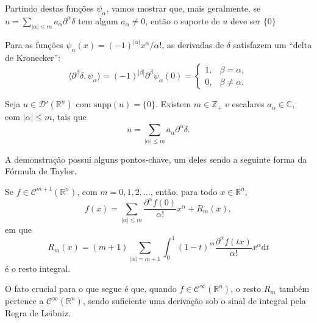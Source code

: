 \documentclass[../distribution_theory_notes.tex]{subfiles}
\begin{document}
Partindo destas funções \(\psi_{\alpha }\), vamos mostrar que, mais geralmente, se \(u = \sum\limits_{| \alpha  |\leq m}^{}a_{\alpha }\partial^{\alpha }\delta \) tem algum \(a_{\alpha }\neq 0\), então o suporte de \(u\) deve ser \(\{0\}\)
\begin{tcolorbox}[
		skin=enhanced,
		title=Observação,
		fonttitle=\bfseries,
		colframe=black,
		colbacktitle=cyan!75!white,
		colback=cyan!15,
		colbacklower=black,
		coltitle=black,
		drop fuzzy shadow,
	]
	Para as funções \(\psi_{\alpha }(x)=(-1)^{|\alpha |}x^{\alpha }/\alpha !\), as derivadas de \(\delta \) satisfazem um ``delta de Kronecker'':
	\[
		\langle \partial^{\beta }\delta , \psi_{\alpha }\rangle
		=(-1)^{|\beta |}\partial^{\beta }\psi_{\alpha }(0)
		=\begin{cases}
			1, & \beta =\alpha ,     \\
			0, & \beta \neq \alpha .
		\end{cases}
	\]
\end{tcolorbox}

\begin{theorem*}
	Seja \(u\in \mathcal{D}'(\mathbb{R}^{n})\) com \(\mathrm{supp}(u)=\{0\}\). Existem \(m\in \mathbb{Z}_{+}\) e escalares \(a_{\alpha }\in \mathbb{C}\), com \(|\alpha |\leq m\), tais que
	\[
		u=\sum\limits_{|\alpha |\leq m}^{}a_{\alpha }\partial^{\alpha }\delta .
	\]
\end{theorem*}

A demonstração possui alguns pontos-chave, um deles sendo a seguinte forma da Fórmula de Taylor.
\begin{theorem*}
	Se \(f\in \mathcal{C}^{m+1}(\mathbb{R}^{n})\), com \(m=0,1,2,\dotsc \), então, para todo \(x\in \mathbb{R}^{n}\),
	\[
		f(x)=\sum\limits_{|\alpha |\leq m}^{}\frac{\partial^{\alpha }f(0)}{\alpha !}x^{\alpha }+R_{m}(x),
	\]
	em que
	\[
		R_{m}(x)=(m+1)\sum\limits_{|\alpha |=m+1}^{}\int_{0}^{1}(1-t)^{m}\frac{\partial^{\alpha }f(tx)}{\alpha !}x^{\alpha }\mathrm{d}t
	\]
	é o resto integral.
\end{theorem*}
O fato crucial para o que segue é que, quando \(f\in \mathcal{C}^{\infty}(\mathbb{R}^{n})\), o resto \(R_{m}\) também pertence a \(\mathcal{C}^{\infty}(\mathbb{R}^{n})\), sendo suficiente uma derivação sob o sinal de integral pela Regra de Leibniz.
\end{document}
